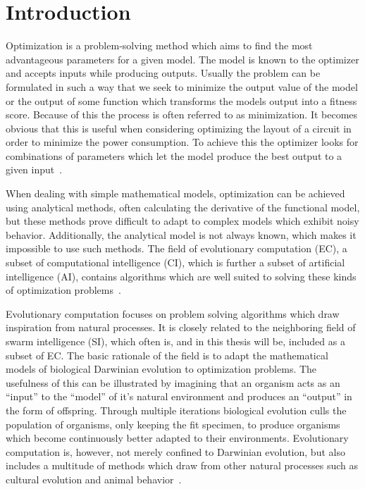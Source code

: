 \section{Introduction}

Optimization is a problem-solving method which aims to find the most advantageous parameters for a given model. The model is known to the optimizer and accepts inputs while producing outputs. Usually the problem can be formulated in such a way that we seek to minimize the output value of the model or the output of some function which transforms the models output into a fitness score. Because of this the process is often referred to as minimization. It becomes obvious that this is useful when considering optimizing the layout of a circuit in order to minimize the power consumption. To achieve this the optimizer looks for combinations of parameters which let the model produce the best output to a given input~\cite{Eiben2015_origins}.


When dealing with simple mathematical models, optimization can be achieved using analytical methods, often calculating the derivative of the functional model, but these methods prove difficult to adapt to complex models which exhibit noisy behavior. Additionally, the analytical model is not always known, which makes it impossible to use such methods. The field of evolutionary computation (EC), a subset of computational intelligence (CI), which is further a subset of artificial intelligence (AI), contains algorithms which are well suited to solving these kinds of optimization problems~\cite{Michalewicz1997,zhang2015comprehensive}.

Evolutionary computation focuses on problem solving algorithms which draw inspiration from natural processes. It is closely related to the neighboring field of swarm intelligence (SI), which often is, and in this thesis will be, included as a subset of EC. The basic rationale of the field is to adapt the mathematical models of biological Darwinian evolution to optimization problems. The usefulness of this can be illustrated by imagining that an organism acts as an ``input'' to the ``model'' of it's natural environment and produces an ``output'' in the form of offspring. Through multiple iterations biological evolution culls the population of organisms, only keeping the fit specimen, to produce organisms which become continuously better adapted to their environments. Evolutionary computation is, however, not merely confined to Darwinian evolution, but also includes a multitude of methods which draw from other natural processes such as cultural evolution and animal behavior~\cite{engelbrecht2007computational}.

